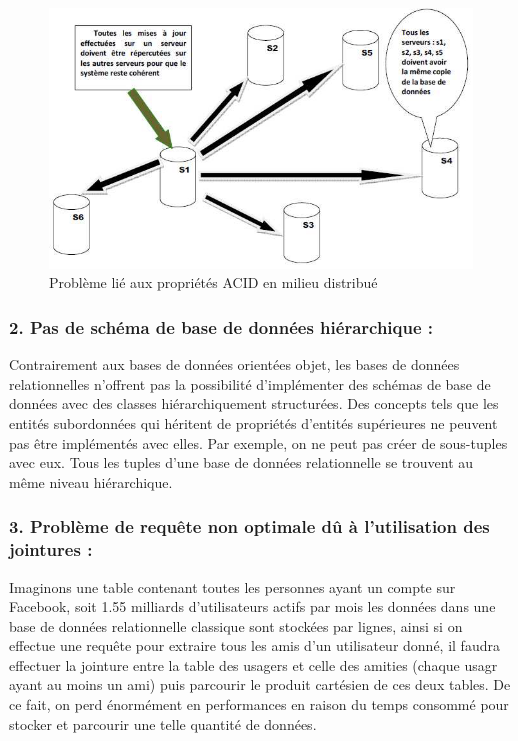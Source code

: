 \begin{figure}[h]
	\centering
    \includegraphics[scale=0.5]{img/part1/4.0.2}
    \caption{Problème lié aux propriétés ACID en milieu distribué}
\end{figure}

\subsubsection{2. Pas de schéma de base de données hiérarchique :  }
Contrairement aux bases de données orientées objet, les bases de données relationnelles n'offrent pas la possibilité d'implémenter des schémas de base de données avec des classes hiérarchiquement structurées. Des concepts tels que les entités subordonnées qui héritent de propriétés d'entités supérieures ne peuvent pas être implémentés avec elles. Par exemple, on ne peut pas créer de sous-tuples avec eux. Tous les tuples d'une base de données relationnelle se trouvent au même niveau hiérarchique.

\subsubsection{3. Problème de requête non optimale dû à l’utilisation des jointures :}
Imaginons une table contenant toutes les personnes ayant un compte sur Facebook, soit 1.55 milliards d’utilisateurs actifs par mois les données dans une base de données relationnelle classique sont stockées par lignes, ainsi si on effectue une requête pour extraire tous les amis d’un utilisateur donné, il faudra effectuer la jointure entre la table des usagers et celle des amities (chaque usagr ayant au moins un ami) puis parcourir le produit cartésien de ces deux tables. De ce fait, on perd énormément en performances en raison du temps consommé pour stocker et parcourir une telle quantité de données.

